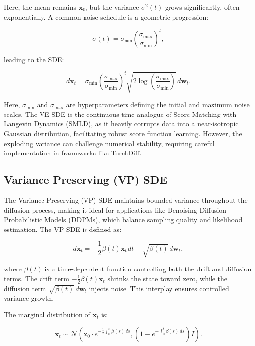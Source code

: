 \documentclass[12pt]{article}
\begin{document}
Here, the mean remains $\mathbf{x}_0$, but the variance $\sigma^2(t)$ grows significantly, often exponentially. A common noise schedule is a geometric progression:

\begin{equation}
    \sigma(t) = \sigma_{\min} \left( \frac{\sigma_{\max}}{\sigma_{\min}} \right)^t,
\end{equation}

leading to the SDE:

\begin{equation}
    d\mathbf{x}_t = \sigma_{\min} \left( \frac{\sigma_{\max}}{\sigma_{\min}} \right)^t \sqrt{2 \log\left(\frac{\sigma_{\max}}{\sigma_{\min}}\right)} \, d\mathbf{w}_t.
\end{equation}

Here, $\sigma_{\min}$ and $\sigma_{\max}$ are hyperparameters defining the initial and maximum noise scales. The VE SDE is the continuous-time analogue of Score Matching with Langevin Dynamics (SMLD), as it heavily corrupts data into a near-isotropic Gaussian distribution, facilitating robust score function learning. However, the exploding variance can challenge numerical stability, requiring careful implementation in frameworks like TorchDiff.

\subsection{Variance Preserving (VP) SDE}

The Variance Preserving (VP) SDE maintains bounded variance throughout the diffusion process, making it ideal for applications like Denoising Diffusion Probabilistic Models (DDPMs), which balance sampling quality and likelihood estimation. The VP SDE is defined as:

\begin{equation}
    d\mathbf{x}_t = -\frac{1}{2} \beta(t) \mathbf{x}_t \, dt + \sqrt{\beta(t)} \, d\mathbf{w}_t,
\end{equation}

where $\beta(t)$ is a time-dependent function controlling both the drift and diffusion terms. The drift term $-\frac{1}{2} \beta(t) \mathbf{x}_t$ shrinks the state toward zero, while the diffusion term $\sqrt{\beta(t)} \, d\mathbf{w}_t$ injects noise. This interplay ensures controlled variance growth.

The marginal distribution of $\mathbf{x}_t$ is:

\begin{equation}
    \mathbf{x}_t \sim \mathcal{N}\left(\mathbf{x}_0 \cdot e^{-\frac{1}{2} \int_0^t \beta(s) \, ds}, \left(1 - e^{-\int_0^t \beta(s) \, ds}\right) I\right).
\end{equation}
\end{document}
